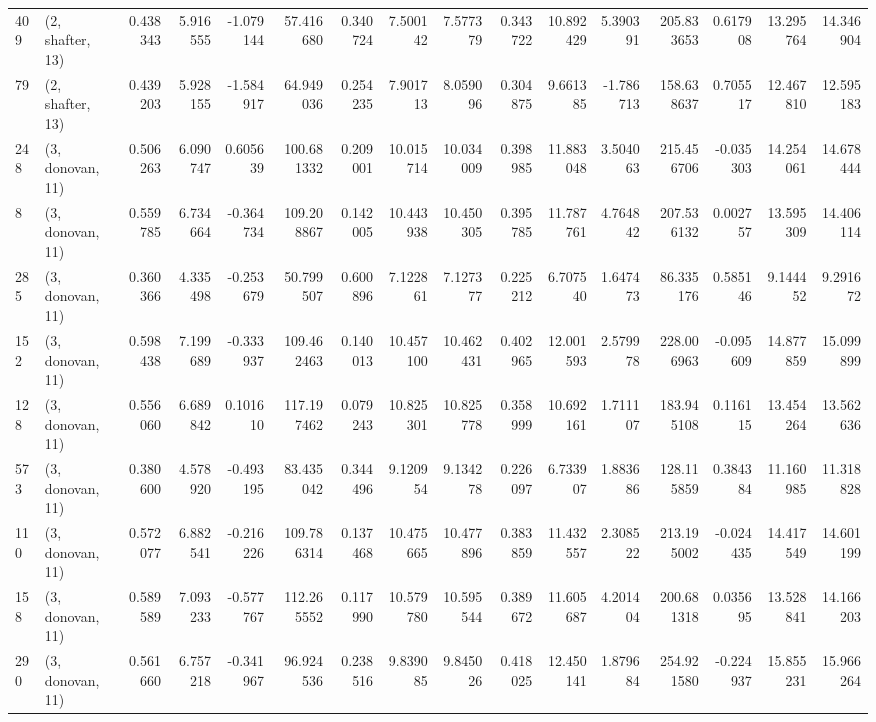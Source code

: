 \begin{tabular}{llrrrrrrrrrrrrrr}
409 &  (2, shafter, 13) &   0.438343 &   5.916555 &  -1.079144 &    57.416680 &   0.340724 &   7.500142 &   7.577379 &  0.343722 &  10.892429 &   5.390391 &    205.833653 &   0.617908 &  13.295764 &   14.346904 \\
79  &  (2, shafter, 13) &   0.439203 &   5.928155 &  -1.584917 &    64.949036 &   0.254235 &   7.901713 &   8.059096 &  0.304875 &   9.661385 &  -1.786713 &    158.638637 &   0.705517 &  12.467810 &   12.595183 \\
248 &  (3, donovan, 11) &   0.506263 &   6.090747 &   0.605639 &   100.681332 &   0.209001 &  10.015714 &  10.034009 &  0.398985 &  11.883048 &   3.504063 &    215.456706 &  -0.035303 &  14.254061 &   14.678444 \\
8   &  (3, donovan, 11) &   0.559785 &   6.734664 &  -0.364734 &   109.208867 &   0.142005 &  10.443938 &  10.450305 &  0.395785 &  11.787761 &   4.764842 &    207.536132 &   0.002757 &  13.595309 &   14.406114 \\
285 &  (3, donovan, 11) &   0.360366 &   4.335498 &  -0.253679 &    50.799507 &   0.600896 &   7.122861 &   7.127377 &  0.225212 &   6.707540 &   1.647473 &     86.335176 &   0.585146 &   9.144452 &    9.291672 \\
152 &  (3, donovan, 11) &   0.598438 &   7.199689 &  -0.333937 &   109.462463 &   0.140013 &  10.457100 &  10.462431 &  0.402965 &  12.001593 &   2.579978 &    228.006963 &  -0.095609 &  14.877859 &   15.099899 \\
128 &  (3, donovan, 11) &   0.556060 &   6.689842 &   0.101610 &   117.197462 &   0.079243 &  10.825301 &  10.825778 &  0.358999 &  10.692161 &   1.711107 &    183.945108 &   0.116115 &  13.454264 &   13.562636 \\
573 &  (3, donovan, 11) &   0.380600 &   4.578920 &  -0.493195 &    83.435042 &   0.344496 &   9.120954 &   9.134278 &  0.226097 &   6.733907 &   1.883686 &    128.115859 &   0.384384 &  11.160985 &   11.318828 \\
110 &  (3, donovan, 11) &   0.572077 &   6.882541 &  -0.216226 &   109.786314 &   0.137468 &  10.475665 &  10.477896 &  0.383859 &  11.432557 &   2.308522 &    213.195002 &  -0.024435 &  14.417549 &   14.601199 \\
158 &  (3, donovan, 11) &   0.589589 &   7.093233 &  -0.577767 &   112.265552 &   0.117990 &  10.579780 &  10.595544 &  0.389672 &  11.605687 &   4.201404 &    200.681318 &   0.035695 &  13.528841 &   14.166203 \\
290 &  (3, donovan, 11) &   0.561660 &   6.757218 &  -0.341967 &    96.924536 &   0.238516 &   9.839085 &   9.845026 &  0.418025 &  12.450141 &   1.879684 &    254.921580 &  -0.224937 &  15.855231 &   15.966264 \\

\end{tabular}
